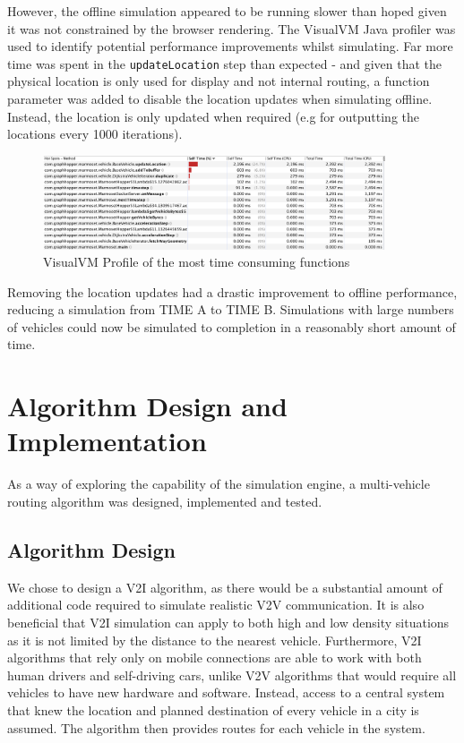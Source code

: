 \documentclass[ %
                    author={Alexander Hill},
                supervisor={Dr. Benjamin Sach},
                    degree={MEng},
                     title={MARMOSET},
                  subtitle={Multi-Agent Route Management using Online Simulation for Efficient Transportation},
                      type={research},
                      year={2016} ]{dissertation}
\begin{document}
However, the offline simulation appeared to be running slower than hoped given
it was not constrained by the browser rendering. The VisualVM Java profiler was
used to identify potential performance improvements whilst simulating.  Far more
time was spent in the \texttt{updateLocation} step than expected - and given
that the physical location is only used for display and not internal routing, a
function parameter was added to disable the location updates when simulating
offline.  Instead, the location is only updated when required (e.g for
outputting the locations every 1000 iterations).

\begin{figure}[h]
    \centering
    \includegraphics[width=0.9\textwidth,clip,trim=0 7cm 0 0]{visualvm-profile}
    \caption{VisualVM Profile of the most time consuming functions}\label{fig:visualvm}
\end{figure}

Removing the location updates had a drastic improvement to offline performance,
reducing a simulation from TIME A to TIME B. Simulations with large numbers of
vehicles could now be simulated to completion in a reasonably short amount of
time.

\section{Algorithm Design and Implementation}

As a way of exploring the capability of the simulation engine, a multi-vehicle
routing algorithm was designed, implemented and tested.

\subsection{Algorithm Design}\label{sec:algo}

We chose to design a V2I algorithm, as there would be a substantial amount of
additional code required to simulate realistic V2V communication. It is also
beneficial that V2I simulation can apply to both high and low density situations
as it is not limited by the distance to the nearest vehicle. Furthermore, V2I
algorithms that rely only on mobile connections are able to work with both human
drivers and self-driving cars, unlike V2V algorithms that would require all
vehicles to have new hardware and software.  Instead, access to a central system
that knew the location and planned destination of every vehicle in a city is
assumed. The algorithm then provides routes for each vehicle in the system.
\end{document}
